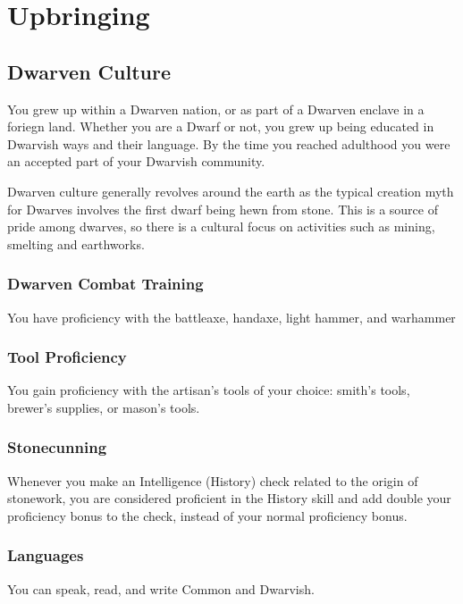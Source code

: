 \documentclass[10pt,twoside]{article}
\begin{document}
\newpage



\section{Upbringing}

\subsection{Dwarven Culture}

You grew up within a Dwarven nation, or as part of a Dwarven enclave in a foriegn land. Whether you are a Dwarf or not, you grew up being educated in Dwarvish ways and their language. By the time you reached adulthood you were an accepted part of your Dwarvish community.

Dwarven culture generally revolves around the earth as the typical creation myth for Dwarves involves the first dwarf being hewn from stone. This is a source of pride among dwarves, so there is a cultural focus on activities such as mining, smelting and earthworks.


\begin{multicols}{2}
\subsubsection*{Dwarven Combat Training}
You have proficiency with the battleaxe, handaxe, light hammer, and warhammer

\subsubsection*{Tool Proficiency}
You gain proficiency with the artisan’s tools of your choice: smith’s tools, brewer’s supplies, or mason’s tools.

\subsubsection*{Stonecunning}
Whenever you make an Intelligence (History) check related to the origin of stonework, you are considered proficient in the History skill and add double your proficiency bonus to the check, instead of your normal proficiency bonus.

\subsubsection*{Languages}
You can speak, read, and write Common and Dwarvish.

\end{multicols}
\end{document}
